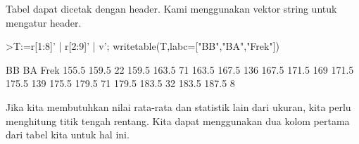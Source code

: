 \documentclass[12pt,Times new roman,letterpaper]{book}
\begin{document}
\begin{eulernootebook}
\begin{eulercomment}
\begin{eulercomment}
\begin{eulernootebook}
\begin{eulercomment}
\begin{eulercomment}
\begin{eulercomment}
\begin{eulercomment}
\begin{eulercomment}
\begin{eulercomment}
\begin{eulercomment}
\begin{eulercomment}
Tabel dapat dicetak dengan header. Kami menggunakan vektor string
untuk mengatur header.
\end{eulercomment}
\begin{eulerprompt}
>T:=r[1:8]' | r[2:9]' | v'; writetable(T,labc=["BB","BA","Frek"])
\end{eulerprompt}
\begin{euleroutput}
          BB        BA      Frek
       155.5     159.5        22
       159.5     163.5        71
       163.5     167.5       136
       167.5     171.5       169
       171.5     175.5       139
       175.5     179.5        71
       179.5     183.5        32
       183.5     187.5         8
\end{euleroutput}
\begin{eulercomment}
Jika kita membutuhkan nilai rata-rata dan statistik lain dari ukuran,
kita perlu menghitung titik tengah rentang. Kita dapat menggunakan dua
kolom pertama dari tabel kita untuk hal ini.


\end{eulercomment}
\end{eulercomment}
\end{eulercomment}
\end{eulercomment}
\end{eulercomment}
\end{eulercomment}
\end{eulercomment}
\end{eulercomment}
\end{eulernootebook}
\end{eulercomment}
\end{eulercomment}
\end{eulernootebook}
\end{document}
